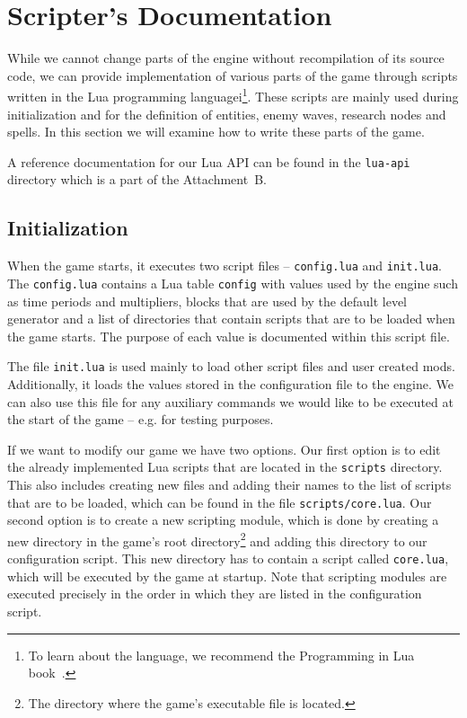 \chapter{Scripter's Documentation}

While we cannot change parts of the engine without recompilation of its source code, we can provide implementation of various parts of the
game through scripts written in the Lua programming languagei\footnote{To learn about the language, we recommend the Programming in Lua
book~\cite{PIL}.}. These scripts are mainly used during initialization and for the definition of
entities, enemy waves, research nodes and spells. In this section we will examine how to write these parts of the game.

A reference documentation for our Lua API can be found in the \texttt{lua-api} directory which is a part of the Attachment~B.

\section{Initialization}

When the game starts, it executes two script files -- \texttt{config.lua} and \texttt{init.lua}. The \texttt{config.lua} contains
a Lua table \texttt{config} with values used by the engine such as time periods and multipliers, blocks that are used by the default
level generator and a list of directories that contain scripts that are to be loaded when the game starts. The purpose of each value
is documented within this script file.

The file \texttt{init.lua} is used mainly to load other script files and user created mods. Additionally, it loads the values stored
in the configuration file to the engine. We can also use this file for any auxiliary commands we would like to be executed at the
start of the game -- e.g. for testing purposes.

If we want to modify our game we have two options. Our first option is to edit the already implemented Lua scripts that are located in the
\texttt{scripts} directory. This also includes creating new files and adding their names to the list of scripts that are to be loaded,
which can be found in the file \texttt{scripts/core.lua}. Our second option is to create a new scripting module, which is done by creating
a new directory in the game's root directory\footnote{The directory where the game's executable file is located.}
and adding this directory to our configuration script. This new directory has to contain a
script called \texttt{core.lua}, which will be executed by the game at startup. Note that scripting modules are executed precisely in
the order in which they are listed in the configuration script.

